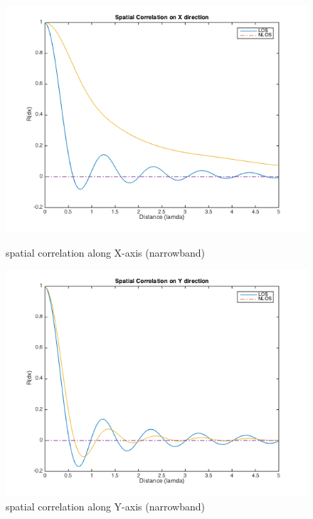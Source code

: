 \documentclass[a4paper]{article}
\begin{document}
    \begin{figure}[ht]
		\begin{minipage}[t]{0.5\linewidth}
			\centering
			\includegraphics[scale=0.4]{figures/nb_spc_X.png}
			\vspace{-0.3cm}
			\centering
			\caption{spatial correlation along X-axis (narrowband)}
            \label{fig:nb_spc_x}
		\end{minipage}
		\begin{minipage}[t]{0.5\linewidth}
			\centering
			\includegraphics[scale=0.4]{figures/nb_spc_Y.png}
			\vspace{-0.3cm}
			\centering
			\caption{spatial correlation along Y-axis (narrowband)}
            \label{fig:nb_spc_y}
		\end{minipage}
    \end{figure}
    
\end{document}
